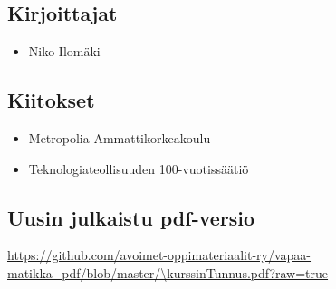 \subsection*{Kirjoittajat}
\begin{itemize}
\item Niko Ilomäki
\end{itemize}

\subsection*{Kiitokset}
\begin{itemize}
\item Metropolia Ammattikorkeakoulu %
\item Teknologiateollisuuden 100-vuotissäätiö %
\end{itemize}

\subsection*{Uusin julkaistu pdf-versio}
\url{https://github.com/avoimet-oppimateriaalit-ry/vapaa-matikka_pdf/blob/master/\kurssinTunnus.pdf?raw=true}
